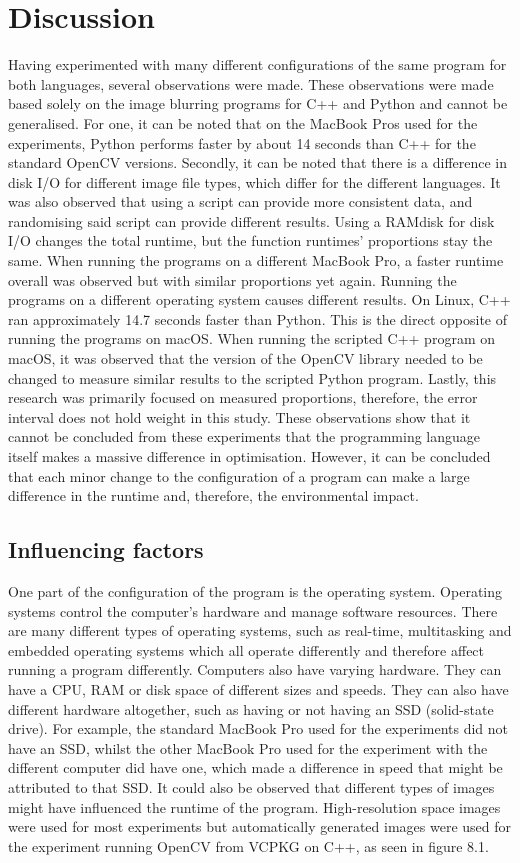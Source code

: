 \chapter{Discussion}
Having experimented with many different configurations of the same program for both languages, several observations were made. These observations were made based solely on the image blurring programs for C++ and Python and cannot be generalised.
For one, it can be noted that on the MacBook Pros used for the experiments, Python performs faster by about 14 seconds than C++ for the standard OpenCV versions. Secondly, it can be noted that there is a difference in disk I/O for different image file types, which differ for the different languages. It was also observed that using a script can provide more consistent data, and randomising said script can provide different results. Using a RAMdisk for disk I/O changes the total runtime, but the function runtimes' proportions stay the same. When running the programs on a different MacBook Pro, a faster runtime overall was observed but with similar proportions yet again. Running the programs on a different operating system causes different results. On Linux, C++ ran approximately 14.7 seconds faster than Python. This is the direct opposite of running the programs on macOS. When running the scripted C++ program on macOS, it was observed that the version of the OpenCV library needed to be changed to measure similar results to the scripted Python program. Lastly, this research was primarily focused on measured proportions, therefore, the error interval does not hold weight in this study.
These observations show that it cannot be concluded from these experiments that the programming language itself makes a massive difference in optimisation. However, it can be concluded that each minor change to the configuration of a program can make a large difference in the runtime and, therefore, the environmental impact.

\section{Influencing factors}
One part of the configuration of the program is the operating system. Operating systems control the computer’s hardware and manage software resources. There are many different types of operating systems, such as real-time, multitasking and embedded operating systems which all operate differently and therefore affect running a program differently.
Computers also have varying hardware. They can have a CPU, RAM or disk space of different sizes and speeds. They can also have different hardware altogether, such as having or not having an SSD (solid-state drive). For example, the standard MacBook Pro used for the experiments did not have an SSD, whilst the other MacBook Pro used for the experiment with the different computer did have one, which made a difference in speed that might be attributed to that SSD.
It could also be observed that different types of images might have influenced the runtime of the program. High-resolution space images were used for most experiments but automatically generated images were used for the experiment running OpenCV from VCPKG on C++, as seen in figure 8.1.

